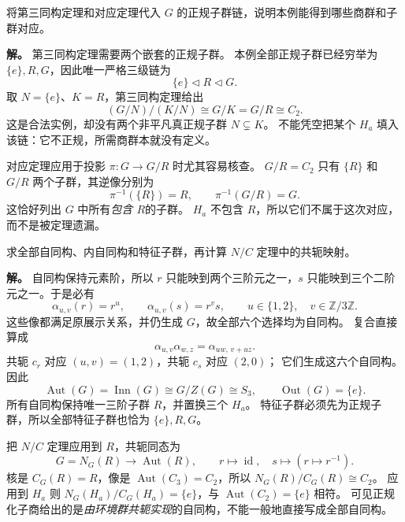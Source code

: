 \begin{workedexample}
\label{ex:d3-comprehensive-correspondence}
将第三同构定理和对应定理代入 $G$ 的正规子群链，说明本例能得到哪些商群和子群对应。

\textbf{解。} 第三同构定理需要两个嵌套的正规子群。
本例全部正规子群已经穷举为 $\{e\},R,G$，因此唯一严格三级链为
\[
\{e\}\lhd R\lhd G.
\]
取 $N=\{e\}$、$K=R$，第三同构定理给出
\[
(G/N)/(K/N)\cong G/K=G/R\cong C_2.
\]
这是合法实例，却没有两个非平凡真正规子群 $N\subsetneq K$。
不能凭空把某个 $H_a$ 填入该链：它不正规，所需商群本就没有定义。

对应定理应用于投影 $\pi:G\to G/R$ 时尤其容易核查。
$G/R=C_2$ 只有 $\{R\}$ 和 $G/R$ 两个子群，其逆像分别为
\[
\pi^{-1}(\{R\})=R,\qquad \pi^{-1}(G/R)=G.
\]
这恰好列出 $G$ 中所有\emph{包含 $R$}的子群。
$H_a$ 不包含 $R$，所以它们不属于这次对应，而不是被定理遗漏。
\end{workedexample}

\begin{workedexample}
\label{ex:d3-comprehensive-automorphisms}
求全部自同构、内自同构和特征子群，再计算 $N/C$ 定理中的共轭映射。

\textbf{解。} 自同构保持元素阶，所以 $r$ 只能映到两个三阶元之一，$s$ 只能映到三个二阶元之一。于是必有
\[
\alpha_{u,v}(r)=r^u,\qquad\alpha_{u,v}(s)=r^v s,
\qquad u\in\{1,2\},\quad v\in\mathbb Z/3\mathbb Z.
\]
这些像都满足原展示关系，并仍生成 $G$，故全部六个选择均为自同构。
复合直接算成
\[
\alpha_{u,v}\alpha_{w,z}=\alpha_{uw,\,v+uz}.
\]
共轭 $c_r$ 对应 $(u,v)=(1,2)$，共轭 $c_s$ 对应 $(2,0)$；
它们生成这六个自同构。因此
\[
\operatorname{Aut}(G)=\operatorname{Inn}(G)\cong G/Z(G)\cong S_3,
\qquad\operatorname{Out}(G)=\{e\}.
\]
所有自同构保持唯一三阶子群 $R$，并置换三个 $H_a$。
特征子群必须先为正规子群，所以全部特征子群也恰为 $\{e\},R,G$。

把 $N/C$ 定理应用到 $R$，共轭同态为
\[
G=N_G(R)\longrightarrow\operatorname{Aut}(R),\qquad
r\mapsto\operatorname{id},\quad s\mapsto(r\mapsto r^{-1}).
\]
核是 $C_G(R)=R$，像是 $\operatorname{Aut}(C_3)=C_2$，所以
$N_G(R)/C_G(R)\cong C_2$。
应用到 $H_a$ 则 $N_G(H_a)/C_G(H_a)=\{e\}$，与 $\operatorname{Aut}(C_2)=\{e\}$ 相符。
可见正规化子商给出的是\emph{由环境群共轭实现}的自同构，不能一般地直接写成全部自同构。
\end{workedexample}

